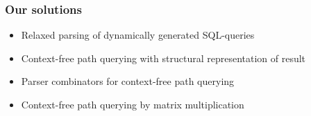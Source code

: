 \documentclass[xcolor=table]{beamer}
\begin{document}
\begin{frame}
  \transwipe[direction=90]
  \frametitle{Our solutions}
  \begin{itemize}
    \item Relaxed parsing of dynamically generated SQL-queries %
    \item Context-free path querying with structural representation of result %
    \item Parser combinators for context-free path querying %
    \item Context-free path querying by matrix multiplication %
  \end{itemize}
\end{frame}
\end{document}
